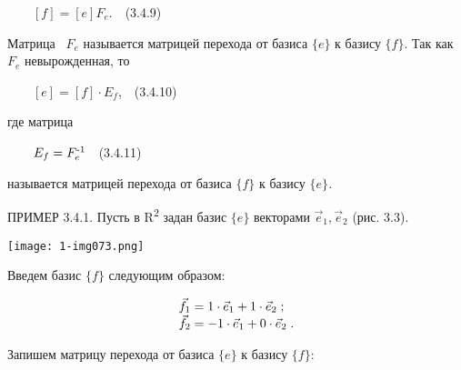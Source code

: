 \documentclass[a4paper]{article}
\newcommand\boldsubformula[1]{\text{\mathversion{bold}$#1$}}
\begin{document}
{\begin{russian}\sffamily
\ \ \ \  $[f]=[e]F_e$.\ \ (3.4.9)
\end{russian}}

{\begin{russian}\sffamily
Матрица \  $F_e$ называется матрицей перехода от базиса  $\{e\}$\textit{ }к базису\textit{ } $\{f\}$. Так как  $F_e$
невырожденная, то
\end{russian}}

{\begin{russian}\sffamily
\ \ \ \  $\left[e\right]=\left[f\right]\cdot E_f$,\ \ (3.4.10)
\end{russian}}

{\begin{russian}\sffamily
где матрица
\end{russian}}

{\begin{russian}\sffamily
\ \ \ \  $E_f=F_e^{\boldsubformula{\text{-1}}}$\ \ (3.4.11)
\end{russian}}

{\begin{russian}\sffamily
называется матрицей перехода от базиса  $\{f\}$ к базису  $\{e\}$\textit{.}
\end{russian}}


\bigskip

{\begin{russian}\sffamily
ПРИМЕР 3.4.1. Пусть в \textenglish{R}\textsuperscript{2} задан базис  $\{e\}$ векторами  $\vec e_1,\vec e_2$ (рис. 3.3).
\end{russian}}


\bigskip

{\centering  \texttt{[image: 1-img073.png]} \par}

\bigskip

{\begin{russian}\sffamily
Введем базис  $\{f\}$ следующим образом:
\end{russian}}

\begin{equation*}
\begin{matrix}\vec f_1=1\cdot \vec e_1+1\cdot \vec e_2\;;\hfill\null \\\vec f_2=-1\cdot \vec e_1+0\cdot \vec
e_2\;.\hfill\null \end{matrix}\hfill 
\end{equation*}
{\begin{russian}\sffamily
Запишем матрицу перехода от базиса  $\{e\}$ к базису  $\{f\}$:
\end{russian}}
\end{document}

